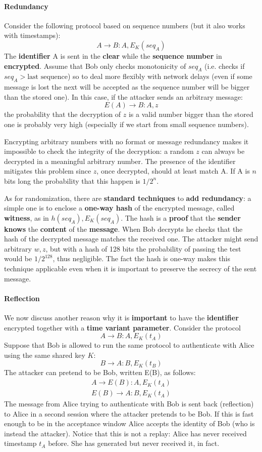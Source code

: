 \paragraph{Redundancy}
Consider the following protocol based on sequence numbers (but it also works with timestamps):
$$A \rightarrow B: A,E_K(seq_A) $$
The \textbf{identifier} A is sent in the \textbf{clear} while the \textbf{sequence number} in \textbf{encrypted}. Assume that Bob only checks monotonicity of $seq_A$ (i.e. checks if $seq_A > \text{last sequence}$) so to deal more flexibly with network delays (even if some message is lost the next will be accepted as the sequence number will be bigger than the stored one). In this case, if the attacker sends an arbitrary message:
$$E(A) \rightarrow B: A,z $$
the probability that the decryption of $z$ is a valid number bigger than the stored one is probably very high (especially if we start from small sequence numbers). 

Encrypting arbitrary numbers with no format or message redundancy makes it impossible to check the integrity of the decryption: a random $z$ can always be decrypted in a meaningful arbitrary number. The presence of the identifier mitigates this problem since $z$, once decrypted, should at least match A. If A is $n$ bits long the probability that this happen is $1/2^n$.

As for randomization, there are \textbf{standard techniques} to \textbf{add redundancy}: a simple one is to enclose a \textbf{one-way hash} of the encrypted message, called \textbf{witness}, as in $h(seq_A),E_K(seq_A)$. The hash is a \textbf{proof} that the \textbf{sender} \textbf{knows} the \textbf{content} of the \textbf{message}. When Bob decrypts he checks that the hash of the decrypted message matches the received one. The attacker might send arbitrary $w,z$, but with a hash of 128 bits the probability of passing the test would be $1/2^{128}$, thus negligible. The fact the hash is one-way makes this technique applicable even when it is important to preserve the secrecy of the sent message.

\paragraph{Reflection}
We now discuss another reason why it is \textbf{important} to have the \textbf{identifier} encrypted together with a \textbf{time variant parameter}. Consider the protocol
$$A \rightarrow B: A,E_K(t_A) $$
Suppose that Bob is allowed to run the same protocol to authenticate with Alice using the same shared key $K$:
$$B \rightarrow A: B,E_K(t_B)$$ 
The attacker can pretend to be Bob, written E(B), as follows:
$$\begin{array}{l} A \rightarrow E(B): A,E_K(t_A)\\ E(B) \rightarrow A: B,E_K(t_A) \end{array} $$
The message from Alice trying to authenticate with Bob is sent back (reflection) to Alice in a second session where the attacker pretends to be Bob. If this is fast enough to be in the acceptance window Alice accepts the identity of Bob (who is instead the attacker). Notice that this is not a replay: Alice has never received timestamp $t_A$ before. She has generated but never received it, in fact.

